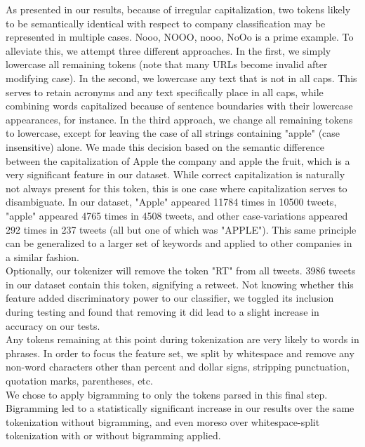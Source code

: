 \documentclass[letterpaper]{article}
\begin{document}
As presented in our results, because of irregular capitalization, two tokens likely to be semantically identical with respect to company classification may be represented in multiple cases. {Nooo, NOOO, nooo, NoOo} is a prime example. To alleviate this, we attempt three different approaches. In the first, we simply lowercase all remaining tokens (note that many URLs become invalid after modifying case). In the second, we lowercase any text that is not in all caps. This serves to retain acronyms and any text specifically place in all caps, while combining words capitalized because of sentence boundaries with their lowercase appearances, for instance. In the third approach, we change all remaining tokens to lowercase, except for leaving the case of all strings containing "apple" (case insensitive) alone. We made this decision based on the semantic difference between the capitalization of Apple the company and apple the fruit, which is a very significant feature in our dataset. While correct capitalization is naturally not always present for this token, this is one case where capitalization serves to disambiguate. In our dataset, "Apple" appeared 11784 times in 10500 tweets, "apple" appeared 4765 times in 4508 tweets, and other case-variations appeared 292 times in 237 tweets (all but one of which was "APPLE"). This same principle can be generalized to a larger set of keywords and applied to other companies in a similar fashion. \\

Optionally, our tokenizer will remove the token "RT" from all tweets. 3986 tweets in our dataset contain this token, signifying a retweet. Not knowing whether this feature added discriminatory power to our classifier, we toggled its inclusion during testing and found that removing it did lead to a slight increase in accuracy on our tests.\\

Any tokens remaining at this point during tokenization are very likely to words in phrases. In order to focus the feature set, we split by whitespace and remove any non-word characters other than percent and dollar signs, stripping punctuation, quotation marks, parentheses, etc. \\

We chose to apply bigramming to only the tokens parsed in this final step. Bigramming led to a statistically significant increase in our results over the same tokenization without bigramming, and even moreso over whitespace-split tokenization with or without bigramming applied.
\end{document}
